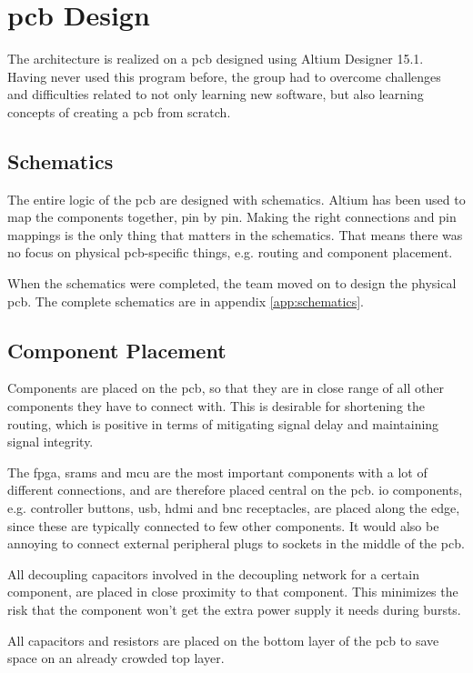 \section{\gls{pcb} Design}
The architecture is realized on a \gls{pcb} designed using Altium Designer 15.1.
Having never used this program before, the group had to overcome challenges and difficulties related to not only learning new software, but also learning concepts of creating a \gls{pcb} from scratch.

\subsection{Schematics}
The entire logic of the \gls{pcb} are designed with schematics.
Altium has been used to map the components together, pin by pin.
Making the right connections and pin mappings is the only thing that matters in the schematics.
That means there was no focus on physical \gls{pcb}-specific things, e.g. routing and component placement.

When the schematics were completed, the team moved on to design the physical \gls{pcb}.
The complete schematics are in appendix \ref{app:schematics}.

\subsection{Component Placement}
Components are placed on the \gls{pcb}, so that they are in close range of all other components they have to connect with.
This is desirable for shortening the routing, which is positive in terms of mitigating signal delay and maintaining signal integrity.

The \gls{fpga}, \gls{sram}s and \gls{mcu} are the most important components with a lot of different connections, and are therefore placed central on the \gls{pcb}.
\gls{io} components, e.g. controller buttons, \gls{usb}, \gls{hdmi} and \gls{bnc} receptacles, are placed along the edge, since these are typically connected to few other components.
It would also be annoying to connect external peripheral plugs to sockets in the middle of the \gls{pcb}.

All decoupling capacitors involved in the decoupling network for a certain component, are placed in close proximity to that component.
This minimizes the risk that the component won't get the extra power supply it needs during bursts.

All capacitors and resistors are placed on the bottom layer of the \gls{pcb} to save space on an already crowded top layer.

